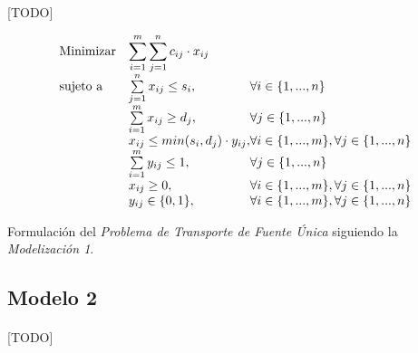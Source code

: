 \documentclass[a4paper, spanish]{article}
\begin{document}
      \paragraph{}
      [TODO]

      \begin{eqfloat}
        \begin{equation}
          \begin{array}{ll@{}ll}
            \text{Minimizar}	& \displaystyle \sum\limits_{i=1}^{m}\sum\limits_{j=1}^{n}c_{ij} \cdot x_{ij} \\
            \text{sujeto a}		& \sum\limits_{j=1}^{n} x_{ij}	\leq s_{i}, & \forall i \in \{1,...,n\}\\
                              &	\sum\limits_{i=1}^{m} x_{ij}	\geq d_{j}, & \forall j \in \{1,...,n\} \\
                              & x_{ij}	\leq min(s_{i}, d_{j}) \cdot y_{ij}, 	& \forall i \in \{1,...,m\}, \forall j \in \{1,...,n\} \\
                              &	\sum\limits_{i=1}^{m} y_{ij}	\leq 1, & \forall j \in \{1,...,n\} \\
                              & x_{ij}	\geq 0, 	& \forall i \in \{1,...,m\}, \forall j \in \{1,...,n\} \\
                              & y_{ij}	\in \{0, 1\}, 	& \forall i \in \{1,...,m\}, \forall j \in \{1,...,n\} \\
          \end{array}
        \end{equation}
        \caption{Formulación del \emph{Problema de Transporte de Fuente Única} siguiendo la \emph{Modelización 1}.}
        \label{eq:single-source-transportation-model-1}
      \end{eqfloat}

    \subsection{Modelo 2}
    \label{sec:approach-2}

      \paragraph{}
      [TODO]
\end{document}
